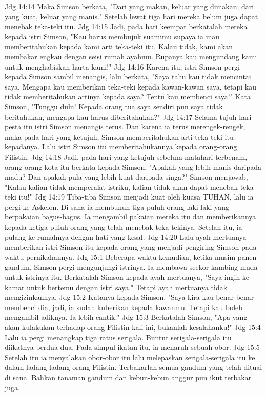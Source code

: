 Jdg 14:14  Maka Simson berkata, "Dari yang makan, keluar yang dimakan; dari yang kuat, keluar yang manis." Setelah lewat tiga hari mereka belum juga dapat menebak teka-teki itu.
Jdg 14:15  Jadi, pada hari keempat berkatalah mereka kepada istri Simson, "Kau harus membujuk suamimu supaya ia mau memberitahukan kepada kami arti teka-teki itu. Kalau tidak, kami akan membakar engkau dengan seisi rumah ayahmu. Rupanya kau mengundang kami untuk menghabiskan harta kami!"
Jdg 14:16  Karena itu, istri Simson pergi kepada Simson sambil menangis, lalu berkata, "Saya tahu kau tidak mencintai saya. Mengapa kau memberikan teka-teki kepada kawan-kawan saya, tetapi kau tidak memberitahukan artinya kepada saya? Tentu kau membenci saya!" Kata Simson, "Tunggu dulu! Kepada orang tua saya sendiri pun saya tidak beritahukan, mengapa kau harus diberitahukan?"
Jdg 14:17  Selama tujuh hari pesta itu istri Simson menangis terus. Dan karena ia terus merengek-rengek, maka pada hari yang ketujuh, Simson memberitahukan arti teka-teki itu kepadanya. Lalu istri Simson itu memberitahukannya kepada orang-orang Filistin.
Jdg 14:18  Jadi, pada hari yang ketujuh sebelum matahari terbenam, orang-orang kota itu berkata kepada Simson, "Apakah yang lebih manis daripada madu? Dan apakah pula yang lebih kuat daripada singa?" Simson menjawab, "Kalau kalian tidak memperalat istriku, kalian tidak akan dapat menebak teka-teki itu!"
Jdg 14:19  Tiba-tiba Simson menjadi kuat oleh kuasa TUHAN, lalu ia pergi ke Askelon. Di sana ia membunuh tiga puluh orang laki-laki yang berpakaian bagus-bagus. Ia mengambil pakaian mereka itu dan memberikannya kepada ketiga puluh orang yang telah menebak teka-tekinya. Setelah itu, ia pulang ke rumahnya dengan hati yang kesal.
Jdg 14:20  Lalu ayah mertuanya memberikan istri Simson itu kepada orang yang menjadi pengiring Simson pada waktu pernikahannya.
Jdg 15:1  Beberapa waktu kemudian, ketika musim panen gandum, Simson pergi mengunjungi istrinya. Ia membawa seekor kambing muda untuk istrinya itu. Berkatalah Simson kepada ayah mertuanya, "Saya ingin ke kamar untuk bertemu dengan istri saya." Tetapi ayah mertuanya tidak mengizinkannya.
Jdg 15:2  Katanya kepada Simson, "Saya kira kau benar-benar membenci dia, jadi, ia sudah kuberikan kepada kawanmu. Tetapi kau boleh mengambil adiknya. Ia lebih cantik."
Jdg 15:3  Berkatalah Simson, "Apa yang akan kulakukan terhadap orang Filistin kali ini, bukanlah kesalahanku!"
Jdg 15:4  Lalu ia pergi menangkap tiga ratus serigala. Buntut serigala-serigala itu diikatnya berdua-dua. Pada simpul ikatan itu, ia menaruh sebuah obor.
Jdg 15:5  Setelah itu ia menyalakan obor-obor itu lalu melepaskan serigala-serigala itu ke dalam ladang-ladang orang Filistin. Terbakarlah semua gandum yang telah dituai di sana. Bahkan tanaman gandum dan kebun-kebun anggur pun ikut terbakar juga.
